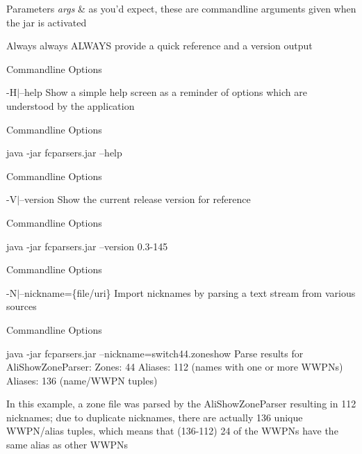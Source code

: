 \begin{DoxyParams}{Parameters}
{\em args} & as you'd expect, these are commandline arguments given when the jar is activated \\
\hline
\end{DoxyParams}
Always always A\+L\+W\+A\+Y\+S provide a quick reference and a version output

\begin{DoxyRefDesc}{Commandline Options}
\item[{\bf Commandline Options}]-\/\+H$\vert$--help Show a simple help screen as a reminder of options which are understood by the application \end{DoxyRefDesc}
\begin{DoxyRefDesc}{Commandline Options}
\item[{\bf Commandline Options}]
\begin{DoxyCode}
java -jar fcparsers.jar --help 
\end{DoxyCode}
\end{DoxyRefDesc}


\begin{DoxyRefDesc}{Commandline Options}
\item[{\bf Commandline Options}]-\/\+V$\vert$--version Show the current release version for reference \end{DoxyRefDesc}
\begin{DoxyRefDesc}{Commandline Options}
\item[{\bf Commandline Options}]
\begin{DoxyCode}
java -jar fcparsers.jar --version
0.3-145 
\end{DoxyCode}
\end{DoxyRefDesc}


\begin{DoxyRefDesc}{Commandline Options}
\item[{\bf Commandline Options}]-\/\+N$\vert$--nickname=\{file/uri\} Import nicknames by parsing a text stream from various sources \end{DoxyRefDesc}
\begin{DoxyRefDesc}{Commandline Options}
\item[{\bf Commandline Options}]
\begin{DoxyCode}
 java -jar fcparsers.jar --nickname=switch44.zoneshow
Parse results \textcolor{keywordflow}{for} AliShowZoneParser:
Zones: 44
Aliases: 112 (names with one or more WWPNs)
Aliases: 136 (name/WWPN tuples) 
\end{DoxyCode}
 In this example, a zone file was parsed by the Ali\+Show\+Zone\+Parser resulting in 112 nicknames; due to duplicate nicknames, there are actually 136 unique W\+W\+P\+N/alias tuples, which means that (136-\/112) 24 of the W\+W\+P\+Ns have the same alias as other W\+W\+P\+Ns\end{DoxyRefDesc}



